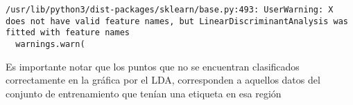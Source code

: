 \begin{Shaded}
\begin{Highlighting}[]
\OperatorTok{=} \OperatorTok{=}\NormalTok{, }\NormalTok{))                }
\NormalTok{)}

\NormalTok{())}
\NormalTok{())}

\OperatorTok{=}
    \OperatorTok{==}\NormalTok{:}
\OperatorTok{=} 
    \NormalTok{:}
\OperatorTok{=} 
\NormalTok{        X\_set.iloc[j,}\NormalTok{],}
\NormalTok{        X\_set.iloc[j,}\NormalTok{],}
\OperatorTok{=}
\OperatorTok{=}
\NormalTok{    )}
\OperatorTok{=}\OperatorTok{+}

\NormalTok{)}
\NormalTok{)}
\NormalTok{)}
\end{Highlighting}
\end{Shaded}

\begin{verbatim}
/usr/lib/python3/dist-packages/sklearn/base.py:493: UserWarning: X does not have valid feature names, but LinearDiscriminantAnalysis was fitted with feature names
  warnings.warn(
\end{verbatim}


Es importante notar que los puntos que no se encuentran clasificados
correctamente en la gráfica por el LDA, corresponden a aquellos datos
del conjunto de entrenamiento que tenían una etiqueta en esa región
